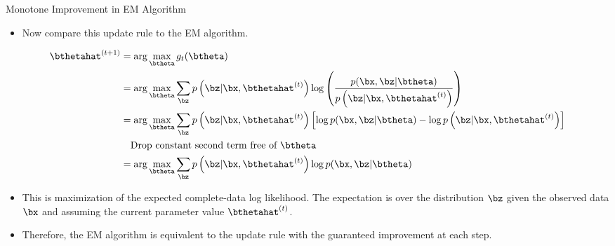 \documentclass[dvipdfmx,bigger,aspectratio=169]{beamer}
\begin{document}
\begin{frame}[allowframebreaks,label=,t]{Monotone Improvement in EM Algorithm}
\begin{itemize}
\item Now compare this update rule to the EM algorithm.
\end{itemize}
\footnotesize
\begin{align*}
  \bthetahat^{(t+1)}
  &= \arg\max_{\btheta} g_{t}(\btheta)\\
  &= \arg\max_{\btheta} \sum_{\bz} p \left( \bz | \bx, \bthetahat^{(t)} \right) \log \left( \frac{p(\bx,\bz | \btheta)}{p \left( \bz | \bx, \bthetahat^{(t)} \right)} \right)\\
  &= \arg\max_{\btheta} \sum_{\bz} p \left( \bz | \bx, \bthetahat^{(t)} \right)
    \left[
    \log p(\bx,\bz | \btheta)
    -
    \log p \left( \bz | \bx, \bthetahat^{(t)} \right)
    \right]\\
  &~~~\text{Drop constant second term free of $\btheta$}\\
  &= \arg\max_{\btheta} \sum_{\bz} p \left( \bz | \bx, \bthetahat^{(t)} \right) \log p(\bx,\bz | \btheta)
\end{align*}
\normalsize
\begin{itemize}
\item This is maximization of the expected complete-data log likelihood. The expectation is over the distribution \(\bz\) given the observed data \(\bx\) and assuming the current parameter value \(\bthetahat^{(t)}\).
\item Therefore, the EM algorithm is equivalent to the update rule with the guaranteed improvement at each step.
\end{itemize}
\end{frame}
\end{document}
